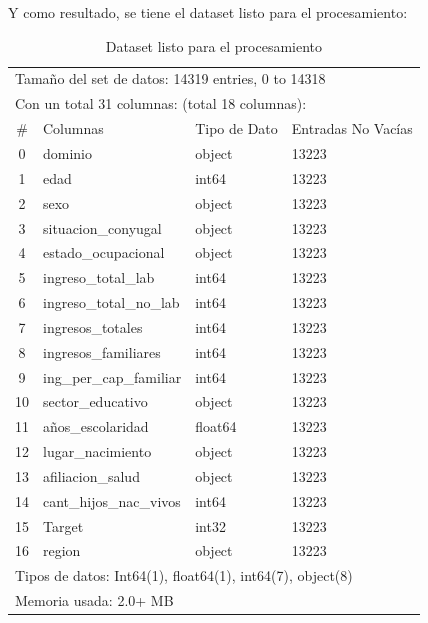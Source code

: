 \documentclass[a4paper]{article}
\begin{document}
 \vspace{1cm}
 
Y como resultado, se tiene el dataset listo para el procesamiento:

        \begin{table}[H]
            \centering
            \begin{tabular}{clll}
                \multicolumn{4}{l}{Tamaño del set de datos: 14319 entries, 0 to 14318} \\
                \multicolumn{4}{l}{Con un total 31 columnas: (total 18 columnas):} \\
                \toprule
                \#  & Columnas & Tipo de Dato & Entradas No Vacías \\ \hline
                0 & dominio & object & 13223 \\ 
                1 & edad & int64 & 13223 \\ 
                2 & sexo & object & 13223 \\ 
                3 & situacion\_conyugal & object & 13223 \\ 
                4 & estado\_ocupacional & object & 13223 \\ 
                5 & ingreso\_total\_lab & int64 & 13223 \\ 
                6 & ingreso\_total\_no\_lab & int64 & 13223 \\ 
                7 & ingresos\_totales & int64 & 13223 \\ 
                8 & ingresos\_familiares & int64 & 13223 \\ 
                9 & ing\_per\_cap\_familiar & int64 & 13223 \\ 
                10 & sector\_educativo & object & 13223 \\ 
                11 & años\_escolaridad & float64 & 13223 \\ 
                12 & lugar\_nacimiento & object & 13223 \\ 
                13 & afiliacion\_salud & object & 13223 \\ 
                14 & cant\_hijos\_nac\_vivos & int64 & 13223 \\ 
                15 & Target & int32 & 13223 \\ 
                16 & region & object & 13223 \\ 
                \bottomrule
                \multicolumn{4}{l}{Tipos de datos: Int64(1), float64(1), int64(7), object(8)} \\
                \multicolumn{4}{l}{Memoria usada: 2.0+ MB} 
            \end{tabular}
            \caption{Dataset listo para el procesamiento}
            \label{Final Dataset}
        \end{table}
\end{document}
